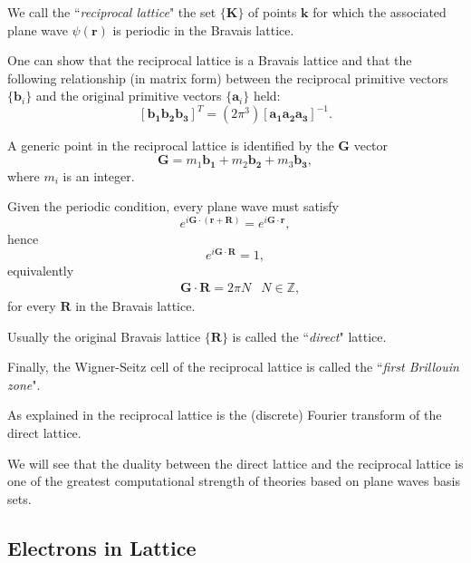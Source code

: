 \documentclass[a4paper,12pt]{article}
\newcommand\erre{\mathbf{r}}
\begin{document}
We call the ``\textit{reciprocal lattice}" the set $\{\mathbf{K}\}$ of points $\mathbf{k}$ for which the associated plane wave $\psi(\erre)$ is periodic in the Bravais lattice.

One can show \cite{Martin} that the reciprocal lattice is a Bravais lattice and that the following relationship (in matrix form) between the reciprocal primitive vectors $\{\mathbf{b}_i\}$ and the original primitive vectors $\{\mathbf{a}_i\}$ held:
\begin{equation}
\left[\mathbf{b_{1}b_{2}b_{3}}\right]^{T} = (2\pi^3) \left[\mathbf{a_{1}a_{2}a_{3}}\right]^{-1}
.
\end{equation}

A generic point in the reciprocal lattice is identified by the $\mathbf{G}$ vector 
\begin{equation}
	\mathbf{G} = m_1\mathbf{b_1} + m_2\mathbf{b_2} + m_3\mathbf{b_3},
\end{equation}
where $m_i$ is an integer.

Given the periodic condition, every plane wave must satisfy 
\begin{equation}
	e^{i \mathbf{G}\cdot (\mathbf{r} + \mathbf{R})} =  	e^{i \mathbf{G}\cdot \mathbf{r}},
\end{equation}
hence 
\begin{equation}
	e^{i \mathbf{G}\cdot \mathbf{R}} =  	1,
\end{equation}
equivalently 
\begin{align}
	&\mathbf{G}\cdot \mathbf{R} = 2\pi N &N\in\mathbb{Z},
\end{align}
for every $\mathbf{R}$ in the Bravais lattice.

Usually the original Bravais lattice $\{ \mathbf{R} \}$ is called the ``\textit{direct}" lattice.

Finally, the Wigner-Seitz cell of the reciprocal lattice is called the ``\textit{first Brillouin zone}".

As explained in \cite[p.121]{Manini} the reciprocal lattice is the (discrete) Fourier transform of the direct lattice.

We will see that the duality between the direct lattice and the reciprocal lattice is one of the greatest computational strength of theories based on plane waves basis sets.

\subsection{Electrons in Lattice}\label{sec:elLattice}
\end{document}
